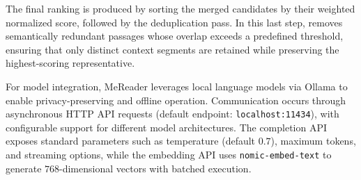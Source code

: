 The final ranking is produced by sorting the merged candidates by their weighted normalized score, followed by the deduplication pass.
In this last step,  removes semantically redundant passages whose overlap exceeds a predefined threshold, ensuring that only distinct context segments are retained while preserving the highest-scoring representative.

For model integration, MeReader leverages local language models via Ollama to enable privacy-preserving and offline operation.
Communication occurs through asynchronous HTTP API requests (default endpoint: \texttt{localhost:11434}), with configurable support for different model architectures.
The completion API exposes standard parameters such as temperature (default $0.7$), maximum tokens, and streaming options, while the embedding API uses \texttt{nomic-embed-text} to generate $768$-dimensional vectors with batched execution.

